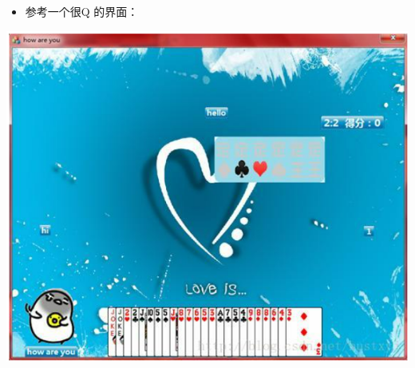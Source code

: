 \documentclass[9pt, b5paper]{article}
\begin{document}
\begin{itemize}
\item 参考一个很Q 的界面：
\end{itemize}

\begin{center}
\includegraphics[width=.9\linewidth]{./pic/plan_20230508_222717.png}
\end{center}
\end{document}
